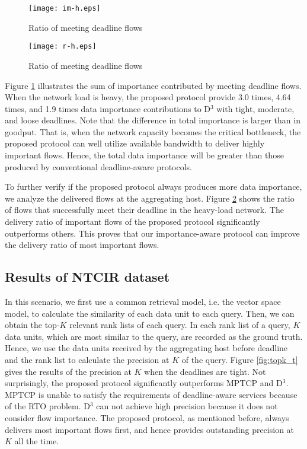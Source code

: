 \documentclass[conference]{IEEEtran}
\begin{document}
\begin{figure}
  \centering
  \texttt{[image: im-h.eps]}\\
  \caption{Ratio of meeting deadline flows}\label{fig:im}
\end{figure}

\begin{figure}
  \centering
  \texttt{[image: r-h.eps]}\\
  \caption{Ratio of meeting deadline flows}\label{fig:ratio}
\end{figure}

Figure \ref{fig:im} illustrates the sum of importance contributed by meeting deadline flows. When the network load is heavy, the proposed protocol provide 3.0 times, 4.64 times, and 1.9 times data importance contributions to D$^{3}$ with tight, moderate, and loose deadlines. Note that the difference in total importance is larger than in goodput. That is, when the network capacity becomes the critical bottleneck, the proposed protocol can well utilize available bandwidth to deliver highly important flows. Hence, the total data importance will be greater than those produced by conventional deadline-aware protocols.

To further verify if the proposed protocol always produces more data importance, we analyze the delivered flows at the aggregating host. Figure \ref{fig:ratio} shows the ratio of flows that successfully meet their deadline in the heavy-load network. The delivery ratio of important flows of the proposed protocol significantly outperforms others. This proves that our importance-aware protocol can improve the delivery ratio of most important flows.




\subsection{Results of NTCIR dataset}

In this scenario, we first use a common retrieval model, i.e. the vector space model, to calculate the similarity of each data unit to each query. Then, we can obtain the top-$K$ relevant rank lists of each query. In each rank list of a query, $K$ data units, which are most similar to the query, are recorded as the ground truth. Hence, we use the data units received by the aggregating host before deadline and the rank list to calculate the precision at $K$ of the query. Figure \ref{fig:topk_t} gives the results of the precision at $K$ when the deadlines are tight. Not surprisingly, the proposed protocol significantly outperforms MPTCP and D$^{3}$. MPTCP is unable to satisfy the requirements of deadline-aware services because of the RTO problem. D$^{3}$ can not achieve high precision because it does not consider flow importance. The proposed protocol, as mentioned before, always delivers most important flows first, and hence provides outstanding precision at $K$ all the time.
\end{document}
